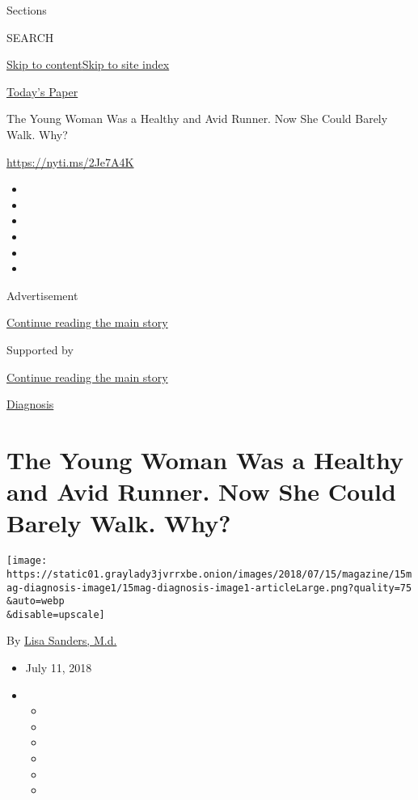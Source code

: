 Sections

SEARCH

\protect\hyperlink{site-content}{Skip to
content}\protect\hyperlink{site-index}{Skip to site index}

\href{https://myaccount.nytimes3xbfgragh.onion/auth/login?response_type=cookie\&client_id=vi}{}

\href{https://www.nytimes3xbfgragh.onion/section/todayspaper}{Today's
Paper}

The Young Woman Was a Healthy and Avid Runner. Now She Could Barely
Walk. Why?

\url{https://nyti.ms/2Je7A4K}

\begin{itemize}
\item
\item
\item
\item
\item
\item
\end{itemize}

Advertisement

\protect\hyperlink{after-top}{Continue reading the main story}

Supported by

\protect\hyperlink{after-sponsor}{Continue reading the main story}

\href{/column/diagnosis}{Diagnosis}

\hypertarget{the-young-woman-was-a-healthy-and-avid-runner-now-she-could-barely-walk-why}{%
\section{The Young Woman Was a Healthy and Avid Runner. Now She Could
Barely Walk.
Why?}\label{the-young-woman-was-a-healthy-and-avid-runner-now-she-could-barely-walk-why}}

\texttt{[image: https://static01.graylady3jvrrxbe.onion/images/2018/07/15/magazine/15mag-diagnosis-image1/15mag-diagnosis-image1-articleLarge.png?quality=75\\\&auto=webp\\\&disable=upscale]}

By \href{https://www.nytimes3xbfgragh.onion/by/lisa-sanders-md}{Lisa
Sanders, M.d.}

\begin{itemize}
\item
  July 11, 2018
\item
  \begin{itemize}
  \item
  \item
  \item
  \item
  \item
  \item
  \end{itemize}
\end{itemize}

